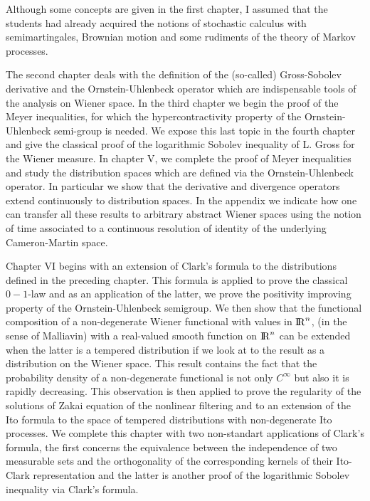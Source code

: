 \documentclass[12pt,a4paper]{book}
\newcommand{\R}{{\rm I\!R}}
\begin{document}
Although some concepts are given  in the first chapter, I assumed
that the students had already acquired the notions of stochastic
calculus with semimartingales, Brownian motion and some rudiments
of the theory of Markov processes.

 The second  chapter deals with the definition of the  (so-called)
Gross-Sobolev derivative and the Ornstein-Uhlenbeck operator which
are indispensable  tools of the analysis on Wiener space. In  the
third chapter we begin the proof of the Meyer inequalities, for
which the hypercontractivity property of the Ornstein-Uhlenbeck
semi-group is needed. We expose this last topic in the fourth
chapter and give the classical proof of the logarithmic Sobolev
inequality of L. Gross  for the Wiener measure. In chapter V, we  
 complete the proof of Meyer inequalities and study the distribution
 spaces which are defined via the Ornstein-Uhlenbeck operator. In
 particular we show that the derivative and divergence operators
 extend continuously to distribution spaces. In the appendix we
 indicate how one can transfer all these results to arbitrary abstract
 Wiener spaces using the notion of time associated to a continuous
 resolution of identity of the underlying Cameron-Martin space.

Chapter VI begins with an extension of Clark's formula to the
distributions defined in the preceding chapter. This formula  is
applied to  prove the classical $0-1$-law and as an application of the
latter, we prove the positivity improving property of the
Ornstein-Uhlenbeck semigroup. We then show that the functional
composition of  a non-degenerate
Wiener functional with values in $\R^n$,  (in the sense of Malliavin)
with a real-valued smooth function on $\R^n$ can be extended when the
latter is a tempered distribution if we look at to the result as a
distribution on the Wiener space. This result contains the fact that
the probability density of a non-degenerate functional is not only
$C^\infty$ but also it is rapidly decreasing. This observation is then
applied to prove the regularity of the solutions of Zakai equation of
the nonlinear filtering and to an extension of the Ito formula to the
space of tempered distributions with non-degenerate Ito processes.
We complete this chapter with two non-standart applications of Clark's
formula, the first concerns the equivalence between the independence
of two measurable sets and the orthogonality of the corresponding
kernels of their Ito-Clark representation and the latter is another
proof of the logarithmic Sobolev inequality via Clark's formula.
\end{document}
